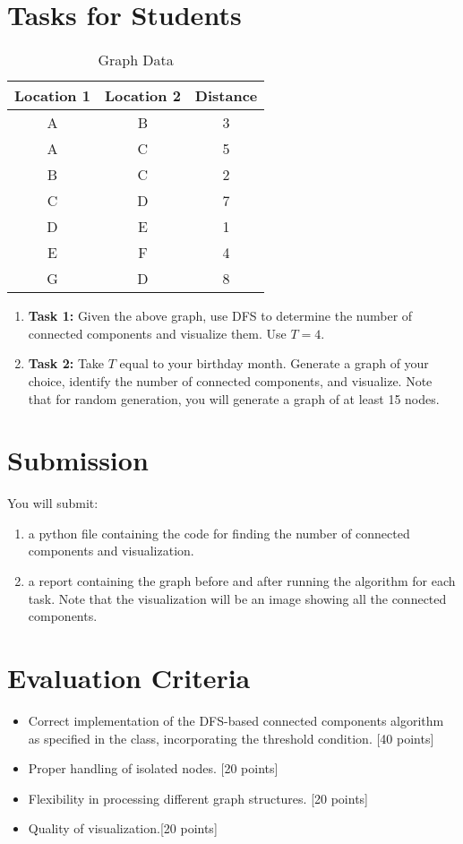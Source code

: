 \documentclass{article}
\begin{document}
\section{Tasks for Students}
\begin{table}[h]
    \centering
    \begin{tabular}{|c|c|c|}
        \hline
        Location 1 & Location 2 & Distance \\
        \hline
        A & B & 3 \\
        A & C & 5 \\
        B & C & 2 \\
        C & D & 7 \\
        D & E & 1 \\
        E & F & 4 \\
        G & D & 8 \\
        \hline
    \end{tabular}
    \caption{Graph Data}
    \label{tab:graph_data}
\end{table}
\begin{enumerate}
    \item \textbf{Task 1:} Given the above graph, use DFS to determine the number of connected components and visualize them. Use $T=4$.
    \item \textbf{Task 2:} Take $T$ equal to your birthday month. Generate a graph of your choice, identify the number of connected components, and visualize. Note that for random generation, you will generate a graph of at least 15 nodes. 
\end{enumerate}

\section{Submission}
You will submit:
\begin{enumerate}
    \item a python file containing the code for finding the number of connected components and visualization.
    \item a report containing the graph before and after running the algorithm for each task. Note that the visualization will be an image showing all the connected components. 
\end{enumerate}
\section{Evaluation Criteria}
\begin{itemize}
    \item Correct implementation of the DFS-based connected components algorithm as specified in the class, incorporating the threshold condition. [40 points]
    \item Proper handling of isolated nodes. [20 points]
    \item Flexibility in processing different graph structures. [20 points]
    \item Quality of visualization.[20 points]
\end{itemize}
\end{document}
